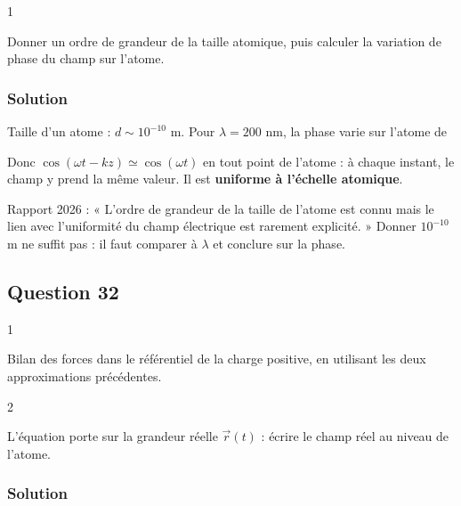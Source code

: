 \documentclass[11pt,a4paper]{article}
\newcommand{\equationajustee}[1]{%
  \sbox{\boiteequation}{$\displaystyle #1$}%
  \ifdim\wd\boiteequation>\linewidth
    \[\resizebox{\linewidth}{!}{\usebox{\boiteequation}}\]%
  \else
    \[#1\]%
  \fi}
\begin{document}
\begin{indication}{1}

Donner un ordre de grandeur de la taille atomique, puis calculer la variation de phase du champ sur l'atome.

\end{indication}

\hypertarget{solution-30}{%
\subsubsection{Solution}\label{solution-30}}

Taille d'un atome : \(d\sim10^{-10}\) m. Pour \(\lambda=200\) nm, la phase varie sur l'atome de

\equationajustee{\frac{2\pi d}{\lambda}\simeq3\cdot10^{-3}\ \text{rad}\ll1}

Donc \(\cos(\omega t-kz)\simeq\cos(\omega t)\) en tout point de l'atome : à chaque instant, le champ y prend la même valeur. Il est \textbf{uniforme à l'échelle atomique}.

\begin{jury}

Rapport 2026 : « L'ordre de grandeur de la taille de l'atome est connu mais le lien avec l'uniformité du champ électrique est rarement explicité. » Donner \(10^{-10}\) m ne suffit pas : il faut comparer à \(\lambda\) et conclure sur la phase.

\end{jury}

\hypertarget{question-32}{%
\subsection{Question 32}\label{question-32}}

\begin{indication}{1}

Bilan des forces dans le référentiel de la charge positive, en utilisant les deux approximations précédentes.

\end{indication}

\begin{indication}{2}

L'équation porte sur la grandeur réelle \(\vec r(t)\) : écrire le champ réel au niveau de l'atome.

\end{indication}

\hypertarget{solution-31}{%
\subsubsection{Solution}\label{solution-31}}
\end{document}
